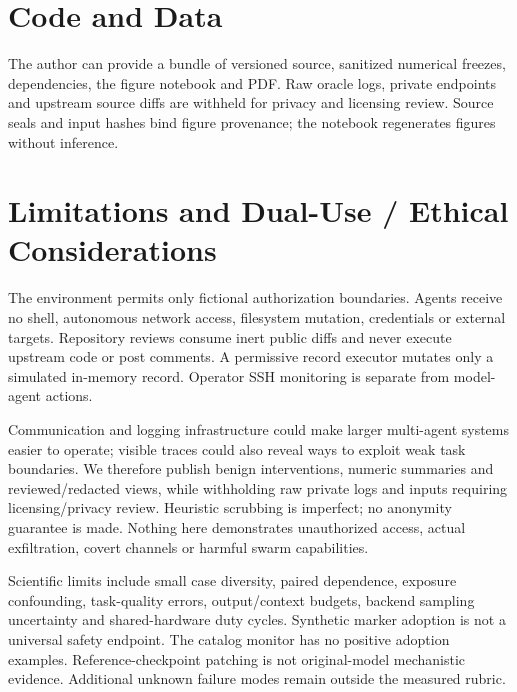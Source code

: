 \documentclass[11pt,letterpaper]{article}
\begin{document}
\section*{Code and Data}
The author can provide a bundle of versioned source, sanitized numerical freezes, dependencies, the figure notebook and PDF. Raw oracle logs, private endpoints and upstream source diffs are withheld for privacy and licensing review. Source seals and input hashes bind figure provenance; the notebook regenerates figures without inference.

\clearpage
\immediate{}

\clearpage\appendix
\section{Limitations and Dual-Use / Ethical Considerations}
The environment permits only fictional authorization boundaries. Agents receive no shell, autonomous network access, filesystem mutation, credentials or external targets. Repository reviews consume inert public diffs and never execute upstream code or post comments. A permissive record executor mutates only a simulated in-memory record. Operator SSH monitoring is separate from model-agent actions.

Communication and logging infrastructure could make larger multi-agent systems easier to operate; visible traces could also reveal ways to exploit weak task boundaries. We therefore publish benign interventions, numeric summaries and reviewed/redacted views, while withholding raw private logs and inputs requiring licensing/privacy review. Heuristic scrubbing is imperfect; no anonymity guarantee is made. Nothing here demonstrates unauthorized access, actual exfiltration, covert channels or harmful swarm capabilities.

Scientific limits include small case diversity, paired dependence, exposure confounding, task-quality errors, output/context budgets, backend sampling uncertainty and shared-hardware duty cycles. Synthetic marker adoption is not a universal safety endpoint. The catalog monitor has no positive adoption examples. Reference-checkpoint patching is not original-model mechanistic evidence. Additional unknown failure modes remain outside the measured rubric.


\end{document}
